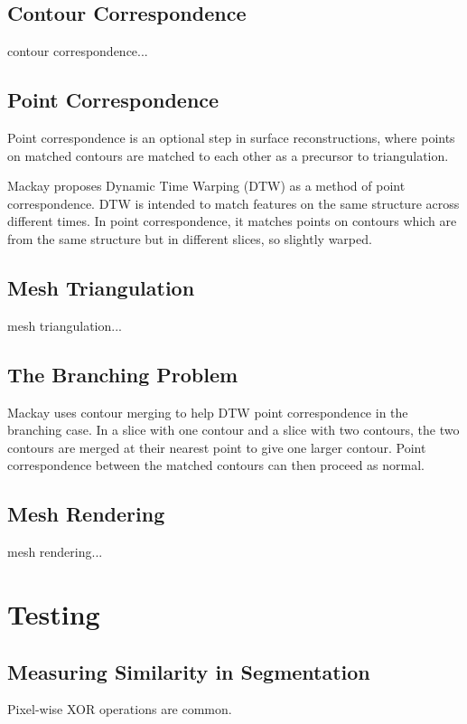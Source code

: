 \documentclass[acmsmall, 12pt]{acmart}
\begin{document}
\subsection{Contour Correspondence}
contour correspondence...

\subsection{Point Correspondence}
Point correspondence is an optional step in surface reconstructions, where points on matched contours are matched to each other as a precursor to triangulation.

Mackay \cite{mackay2019robust} proposes Dynamic Time Warping (DTW) as a method of point correspondence. DTW is intended to match features on the same structure across different times. In point correspondence, it matches points on contours which are from the same structure but in different slices, so slightly warped. 

\subsection{Mesh Triangulation}
mesh triangulation...

\subsection{The Branching Problem}

Mackay \cite{mackay2019robust} uses contour merging to help DTW point correspondence in the branching case. In a slice with one contour and a slice with two contours, the two contours are merged at their nearest point to give one larger contour. Point correspondence between the matched contours can then proceed as normal.

\subsection{Mesh Rendering}
mesh rendering...

\section{Testing}

\subsection{Measuring Similarity in Segmentation}

Pixel-wise XOR operations are common.
\end{document}
